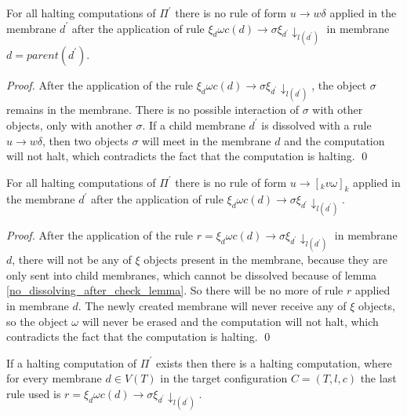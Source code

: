 \documentclass[llncs,submission,copyright,creativecommons]{../lib/lncs/llncs}
\begin{document}
\begin{lemma}
\label{no_dissolving_after_check_lemma}
  For all halting computations of $\Pi^\prime$ there is no rule of form $u\rightarrow w\delta$ applied in the membrane $d^\prime$ after the application of rule $\xi_d\omega c(d)\rightarrow\sigma\xi_{d^\prime}\downarrow_{l(d^\prime)}$ in membrane $d=parent(d^\prime)$.
\end{lemma}

\begin{proof}
  After the application of the rule $\xi_d\omega c(d)\rightarrow\sigma\xi_{d^\prime}\downarrow_{l(d^\prime)}$, the object $\sigma$ remains in the membrane. There is no possible interaction of $\sigma$ with other objects, only with another $\sigma$. If a child membrane $d^\prime$ is dissolved with a rule $u\rightarrow w\delta$, then two objects $\sigma$ will meet in the membrane $d$ and the computation will not halt, which contradicts the fact that the computation is halting. \qed
\end{proof}

\begin{lemma}
\label{no_creating_new_membrane_after_check_lemma}
  For all halting computations of $\Pi^\prime$ there is no rule of form $u\rightarrow [_k v\omega]_k$ applied in the membrane $d^\prime$ after the application of rule $\xi_d\omega c(d)\rightarrow\sigma\xi_{d^\prime}\downarrow_{l(d^\prime)}$.
\end{lemma}

\begin{proof}
  After the application of the rule $r = \xi_d\omega c(d)\rightarrow\sigma\xi_{d^\prime}\downarrow_{l(d^\prime)}$ in membrane $d$, there will not be any of $\xi$ objects present in the membrane, because they are only sent into child membranes, which cannot be dissolved because of lemma \ref{no_dissolving_after_check_lemma}. So there will be no more of rule $r$ applied in membrane $d$. The newly created membrane will never receive any of $\xi$ objects, so the object $\omega$ will never be erased and the computation will not halt, which contradicts the fact that the computation is halting. \qed
\end{proof}

\begin{lemma}
\label{check_at_last_lemma}
  If a halting computation of $\Pi^\prime$ exists then there is a halting computation, where for every membrane $d\in V(T)$ in the target configuration $C=(T,l,c)$ the last rule used is $r = \xi_d\omega c(d)\rightarrow\sigma\xi_{d^\prime}\downarrow_{l(d^\prime)}$.
\end{lemma}
\end{document}
